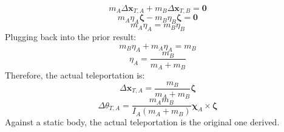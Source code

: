 \documentclass[10pt]{report}
\begin{document}
\begin{equation}m_A\Delta\boldsymbol{x}_{T,A}+m_B\Delta\boldsymbol{x}_{T,B}=\boldsymbol{0}\end{equation}
\begin{equation}m_A\eta_A\boldsymbol{\zeta}-m_B\eta_B\boldsymbol{\zeta}=\boldsymbol{0}\end{equation}
\begin{equation}m_A\eta_A=m_B\eta_B\end{equation}
Plugging back into the prior result:
\begin{equation}m_B\eta_A+m_A\eta_A=m_B\end{equation}
\begin{equation}\eta_A=\frac{m_B}{m_A+m_B}\end{equation}
Therefore, the actual teleportation is:
\begin{equation}\Delta\boldsymbol{x}_{T,A}=\frac{m_B}{m_A+m_B}\boldsymbol{\zeta}\end{equation}
\begin{equation}\Delta\theta_{T,A}=\frac{m_Am_B}{I_A(m_A+m_B)}\boldsymbol{\chi}_A\times\boldsymbol{\zeta}\end{equation}
Against a static body, the actual teleportation is the original one derived.
\end{document}

